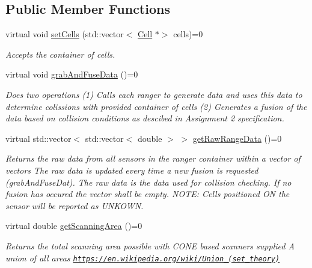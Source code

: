 \subsection*{Public Member Functions}
\begin{DoxyCompactItemize}
\item 
virtual void \hyperlink{classRangerFusionInterface_ab8fdee0050521767d33179a63da91e4f}{set\+Cells} (std\+::vector$<$ \hyperlink{classCell}{Cell} $\ast$$>$ cells)=0
\begin{DoxyCompactList}\small\item\em Accepts the container of cells. \end{DoxyCompactList}\item 
\mbox{\label{classRangerFusionInterface_ada6afdab2ce6d58a1bd0134f5e2be23f}} 
virtual void \hyperlink{classRangerFusionInterface_ada6afdab2ce6d58a1bd0134f5e2be23f}{grab\+And\+Fuse\+Data} ()=0
\begin{DoxyCompactList}\small\item\em Does two operations (1) Calls each ranger to generate data and uses this data to determine colissions with provided container of cells (2) Generates a \textquotesingle{}fusion\textquotesingle{} of the data based on collision conditions as descibed in Assignment 2 specification. \end{DoxyCompactList}\item 
virtual std\+::vector$<$ std\+::vector$<$ double $>$ $>$ \hyperlink{classRangerFusionInterface_a9d60ca5866261026b870d7c0171587f5}{get\+Raw\+Range\+Data} ()=0
\begin{DoxyCompactList}\small\item\em Returns the raw data from all sensors in the ranger container within a vector of vectors The raw data is updated every time a new fusion is requested (grab\+And\+Fuse\+Dat). The raw data is the data used for collision checking. If no fusion has occured the vector shall be empty. N\+O\+TE\+: Cells positioned ON the sensor will be reported as U\+N\+K\+O\+WN. \end{DoxyCompactList}\item 
virtual double \hyperlink{classRangerFusionInterface_a65155605804376da4f67baf3c6f97f40}{get\+Scanning\+Area} ()=0
\begin{DoxyCompactList}\small\item\em Returns the total scanning area possible with C\+O\+NE based scanners supplied A union of all areas \href{https://en.wikipedia.org/wiki/Union_(set_theory)}{\tt https\+://en.\+wikipedia.\+org/wiki/\+Union\+\_\+(set\+\_\+theory)} \end{DoxyCompactList}\end{DoxyCompactItemize}


